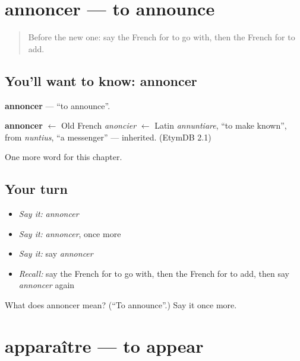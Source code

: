 \section[annoncer]{annoncer — to announce}

\label{lesson:FR-C178-annoncer}



\begin{quote}
Before the new one: say the French for to go with, then the French for to add.
\end{quote}

\subsection*{You'll want to know: annoncer}
\textbf{annoncer} — \textquotedblleft{}to announce\textquotedblright{}.

\begin{cousinweb}
\textbf{annoncer} $\leftarrow$ Old French \emph{anoncier} $\leftarrow$ Latin \emph{annuntiare}, \textquotedblleft{}to make known\textquotedblright{}, from \emph{nuntius}, \textquotedblleft{}a messenger\textquotedblright{} — inherited. (EtymDB 2.1)
\end{cousinweb}

\begin{grammarlens}[title={What you've built}]
One more word for this chapter.
\end{grammarlens}

\subsection*{Your turn}
\begin{itemize}
\raggedright
  \item \emph{Say it:} \emph{annoncer}
  \item \emph{Say it:} \emph{annoncer}, once more
  \item \emph{Say it:} say \emph{annoncer}
  \item \emph{Recall:} say the French for to go with, then the French for to add, then say \emph{annoncer} again
\end{itemize}

\begin{tcolorbox}[breakable,colback=teal!4,colframe=teal!35!black,title={Before you move on}]
What does annoncer mean? (\textquotedblleft{}To announce\textquotedblright{}.) Say it once more.
\end{tcolorbox}
\section[apparaître]{apparaître — to appear}

